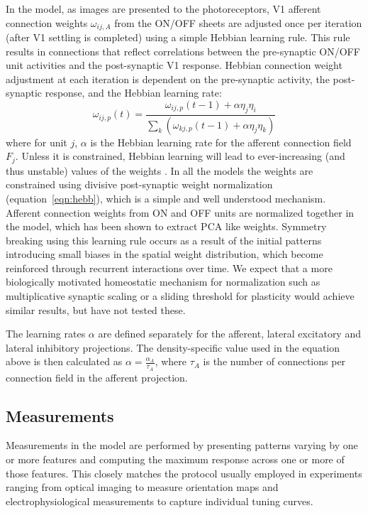 In the model, as images are presented to the photoreceptors, V1
afferent connection weights $\omega_{ij,A}$ from the ON/OFF sheets are
adjusted once per iteration (after V1 settling is completed) using a
simple Hebbian learning rule. This rule results in connections that
reflect correlations between the pre-synaptic ON/OFF unit activities
and the post-synaptic V1 response.  Hebbian connection weight
adjustment at each iteration is dependent on the pre-synaptic
activity, the post-synaptic response, and the Hebbian learning rate:
\begin{equation}
\omega_{ij,p}(t)=\frac{\omega_{ij,p}(t-1)+\alpha\eta_{j}\eta_{i}}{\sum_{k}\left(\omega_{kj,p}(t-1)+\alpha\eta_{j}\eta_{k}\right)}
\label{eqn:hebb}
\end{equation}
where for unit $j$, $\alpha$ is the Hebbian learning rate for the
afferent connection field $F_{j}$. Unless it is constrained, Hebbian
learning will lead to ever-increasing (and thus unstable) values of
the weights \citep{Rochester1956}. In all the models the weights are
constrained using divisive post-synaptic weight normalization
(equation~\ref{eqn:hebb}), which is a simple and well understood
mechanism. Afferent connection weights from ON and OFF units are
normalized together in the model, which has been shown to extract PCA
like weights. Symmetry breaking using this learning rule occurs as a
result of the initial patterns introducing small biases in the spatial
weight distribution, which become reinforced through recurrent
interactions over time. We expect that a more biologically motivated
homeostatic mechanism for normalization such as multiplicative
synaptic scaling \citep{Turrigiano1999,Turrigiano2004,Sullivan2006} or
a sliding threshold for plasticity \citep{Bienenstock1982} would
achieve similar results, but have not tested these.

The learning rates $\alpha$ are defined separately for the afferent,
lateral excitatory and lateral inhibitory projections. The
density-specific value used in the equation above is then calculated
as $\alpha=\frac{\alpha_{A}}{\tau_{A}}$, where $\tau_{A}$ is the
number of connections per connection field in the afferent projection.


\subsection{Measurements}

Measurements in the model are performed by presenting patterns varying
by one or more features and computing the maximum response across one
or more of those features. This closely matches the protocol usually
employed in experiments ranging from optical imaging to measure
orientation maps and electrophysiological measurements to capture
individual tuning curves.

